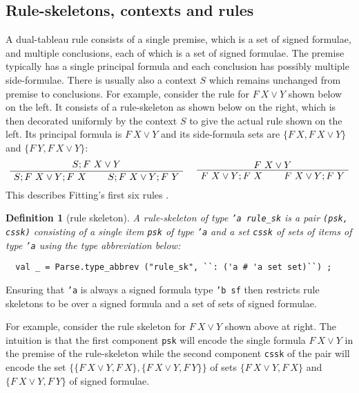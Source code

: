 \documentclass[a4paper]{article}
\newtheorem{definition}{Definition}
\begin{document}
\subsection{Rule-skeletons, contexts and rules}
A dual-tableau rule consists of a single premise,
which is a set of signed formulae,
and multiple conclusions, each of which is a set of signed formulae.
The premise typically has a single principal formula
and each conclusion has possibly multiple side-formulae. There is
usually also a context $S$ which remains unchanged from premise to
conclusions. For example, consider the rule for $F ~ X \lor Y$ shown
below on the left. It consists of a rule-skeleton as shown below on
the right, which is then decorated uniformly by the context $S$ to
give the actual rule shown on the left. Its principal formula is
$F~ X \lor Y$ and its side-formula sets are $\{F~X , F~ X \lor Y \}$
and $\{F~Y , F~ X \lor Y \}$:
\[
\rootAtTop
\AxiomC{$S ; F ~ X \lor Y; F ~ X$}
\AxiomC{$S ; F ~ X \lor Y; F ~ Y$}
\BinaryInfC{$S ; F ~ X \lor Y$}
\DisplayProof
\hspace{0.5cm}
\rootAtTop
\AxiomC{$F ~ X \lor Y; F ~ X$}
\AxiomC{$F ~ X \lor Y; F ~ Y$}
\BinaryInfC{$F ~ X \lor Y$}
\DisplayProof
\]
This describes Fitting's first six rules
\cite[Figure~1.6]{fitting-dual-tableau}.

\begin{definition}[rule skeleton]
  A rule-skeleton of type \texttt{'a rule\_sk} is a pair \texttt{(psk, cssk)}
  consisting of a single item \texttt{psk} of type \texttt{'a} and
  a set \texttt{cssk} of sets of items of type
  \texttt{'a} using the type abbreviation below:
\begin{verbatim}
  val _ = Parse.type_abbrev ("rule_sk", ``: ('a # 'a set set)``) ;
\end{verbatim}
\end{definition}

Ensuring  that
\texttt{'a} is always a signed formula type \texttt{'b sf} then restricts
rule skeletons to be over a signed formula and a set of sets of
signed formulae.

For example, consider the rule skeleton for
$F ~ X \lor Y$
shown above at right.
The intuition is that the first component
\texttt{psk}
will encode the single formula $F ~ X \lor Y$ in the premise of the
rule-skeleton while 
the second component
\texttt{cssk}
of the pair will encode the set 
$\{\{F ~ X \lor Y, F~ X\}, \{F ~ X \lor Y, F~ Y\}\}$ 
of sets
$\{F ~ X \lor Y, F~ X\}$
and
$\{F ~ X \lor Y, F~ Y\}$
of signed formulae.
\end{document}
